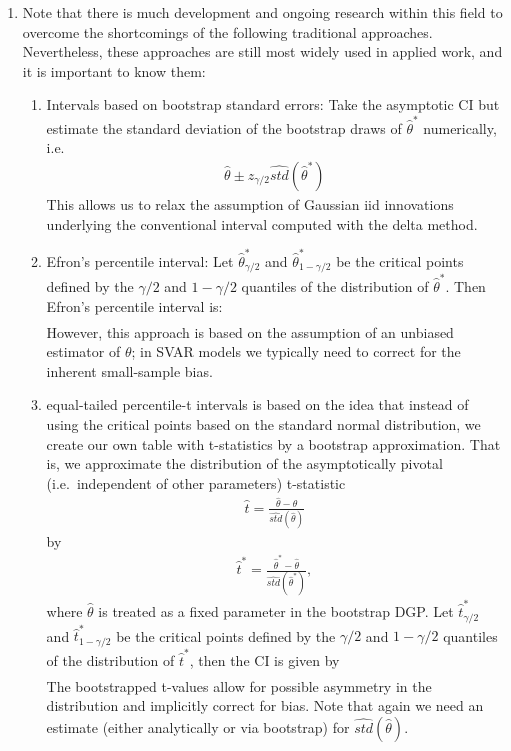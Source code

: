 \begin{enumerate}
\item Note that there is much development and ongoing research within this field to overcome the shortcomings of the following traditional approaches.
Nevertheless, these approaches are still most widely used in applied work, and it is important to know them:

\begin{enumerate}

\item Intervals based on bootstrap standard errors:
Take the asymptotic CI but estimate the standard deviation of the bootstrap draws of \(\hat{\theta}^{\ast}\) numerically, i.e.\
\begin{align*}
\hat{\theta} \pm z_{\gamma/2} \widehat{std}(\hat{\theta}^{\ast})
\end{align*}
This allows us to relax the assumption of Gaussian iid innovations underlying the conventional interval computed with the delta method.

\item Efron's percentile interval:
Let \(\hat{\theta}^{\ast}_{\gamma/2}\) and \(\hat{\theta}^{\ast}_{1-\gamma/2}\) be the critical points
  defined by the \(\gamma/2\) and \(1-\gamma/2\) quantiles of the distribution of \(\hat{\theta}^{\ast} \).
Then Efron's percentile interval is:
\begin{align*}
  [\hat{\theta}^{\ast}_{\gamma/2},\hat{\theta}^{\ast}_{1-\gamma/2}]
\end{align*}
However, this approach is based on the assumption of an unbiased estimator of \(\theta \);
  in SVAR models we typically need to correct for the inherent small-sample bias.

\item equal-tailed percentile-t intervals is based on the idea that instead of using the critical points based on the standard normal distribution,
  we create our own table with t-statistics by a bootstrap approximation.
That is, we approximate the distribution of the asymptotically pivotal (i.e.\ independent of other parameters) t-statistic
\begin{align*}
\hat{t}=\frac{\hat{\theta}-\theta}{\widehat{std}(\hat{\theta})}
\end{align*}
by 
\begin{align*}
\hat{t}^{\ast} = \frac{\hat{\theta}^{\ast}-\hat{\theta}}{\widehat{std}(\hat{\theta}^{\ast})},
\end{align*}
  where \(\hat{\theta}\) is treated as a fixed parameter in the bootstrap DGP\@.
Let \(\hat{t}^{\ast}_{\gamma/2}\) and \(\hat{t}^{\ast}_{1-\gamma/2}\) be the critical points
  defined by the \(\gamma/2\) and \(1-\gamma/2\) quantiles of the distribution of \(\hat{t}^{\ast} \),
  then the CI is given by
\begin{align*}
  [\hat{\theta}-\hat{t}^{\ast}_{1-\gamma/2} \widehat{std}(\hat{\theta}); \hat{\theta}-\hat{t}^{\ast}_{\gamma/2} \widehat{std}(\hat{\theta})]
\end{align*}
The bootstrapped t-values allow for possible asymmetry in the distribution and implicitly correct for bias.
Note that again we need an estimate (either analytically or via bootstrap) for \(\widehat{std}(\hat{\theta})\).


\end{enumerate}
\end{enumerate}

